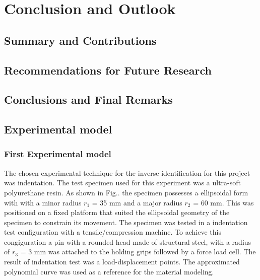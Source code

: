 
\chapter{Conclusion and Outlook} %

\label{Chapter7} %

\section{Summary and Contributions}

\section{Recommendations for Future Research}
\section{Conclusions and Final Remarks}



\section{Experimental model}

\subsection{First Experimental model}
The chosen experimental technique for the inverse identification for this project was indentation. 
The test specimen used for this experiment was a ultra-soft polyurethane resin. 
As shown in Fig.. the specimen possesses a ellipsoidal form with 
with a minor radius \(r_1\) = 35 mm and a major radius \(r_2\) = 60 mm. This was positioned
 on a fixed platform that suited the ellipsoidal geometry of the 
 specimen to constrain its movement. 
 The specimen was tested in a indentation test configuration with a tensile/compression machine.
 To achieve this congiguration a pin with a rounded head made of structural steel, 
 with a radius of \(r_3\) = 3 mm was attached 
 to the holding grips followed by a force load cell. 
The result of indentation test was a load-displacement points. The approximated 
polynomial curve was used as a reference for the material modeling.


